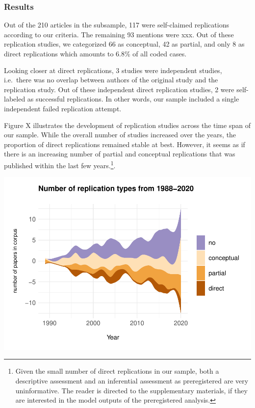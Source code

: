 \documentclass[]{elsarticle} %
\begin{document}
\hypertarget{results-1}{%
\subsubsection{Results}\label{results-1}}

Out of the 210 articles in the subsample, 117 were self-claimed
replications according to our criteria. The remaining 93 mentions were
xxx. Out of these replication studies, we categorized 66 as conceptual,
42 as partial, and only 8 as direct replications which amounts to 6.8\%
of all coded cases.

Looking closer at direct replications, 3 studies were independent
studies, i.e.~there was no overlap between authors of the original study
and the replication study. Out of these independent direct replication
studies, 2 were self-labeled as successful replications. In other words,
our sample included a single independent failed replication attempt.

Figure X illustrates the development of replication studies across the
time span of our sample. While the overall number of studies increased
over the years, the proportion of direct replications remained stable at
best. However, it seems as if there is an increasing number of partial
and conceptual replications that was published within the last few
years.\footnote{Given the small number of direct replications in our
  sample, both a descriptive assessment and an inferential assessment as
  preregistered are very uninformative. The reader is directed to the
  supplementary materials, if they are interested in the model outputs
  of the preregistered analysis.}.

\begin{center}\includegraphics[width=1\linewidth]{ReplicationLing_files/figure-latex/steam_plot-1} \end{center}
\end{document}
